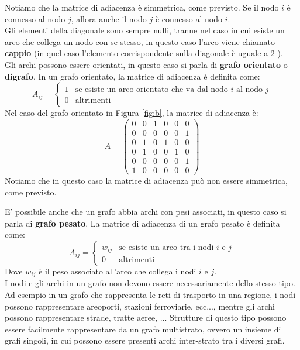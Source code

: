Notiamo che la matrice di adiacenza è simmetrica, come previsto. Se il nodo $i$ è connesso al nodo $j$, allora anche il nodo $j$ è connesso al nodo $i$.\\
Gli elementi della diagonale sono sempre nulli, tranne nel caso in cui esiste un arco che collega un nodo con se stesso, in questo caso l'arco viene chiamato \textbf{cappio} (in quel caso l'elemento corrispondente sulla diagonale è uguale a 2 ).\\

Gli archi possono essere orientati, in questo caso si parla di \textbf{grafo orientato} o \textbf{digrafo}. In un grafo orientato, la matrice di adiacenza è definita come:
\begin{equation}
A_{ij} = \begin{cases}
1 & \text{se esiste un arco orientato che va dal nodo } i \text{ al nodo } j \\
0 & \text{altrimenti}
\end{cases} 
\end{equation}
Nel caso del grafo orientato in Figura \ref{fig:b}, la matrice di adiacenza è:
\begin{equation}
A = \begin{pmatrix}
0 & 0 & 1 & 0 & 0 & 0 \\
0 & 0 & 0 & 0 & 0 & 1 \\
0 & 1 & 0 & 1 & 0 & 0 \\
0 & 1 & 0 & 0 & 1 & 0 \\
0 & 0 & 0 & 0 & 0 & 1 \\
1 & 0 & 0 & 0 & 0 & 0
\end{pmatrix}
\end{equation}
Notiamo che in questo caso la matrice di adiacenza può non essere simmetrica, come previsto.

E' possibile anche che un grafo abbia archi con pesi associati, in questo caso si parla di \textbf{grafo pesato}. La matrice di adiacenza di un grafo pesato è definita come:
\begin{equation}
A_{ij} = \begin{cases}
w_{ij} & \text{se esiste un arco tra i nodi } i \text{ e } j \\
0 & \text{altrimenti}
\end{cases}
\end{equation}
Dove $w_{ij}$ è il peso associato all'arco che collega i nodi $i$ e $j$.\\
I nodi e gli archi in un grafo non devono essere necessariamente dello stesso tipo. Ad esempio in un grafo che rappresenta le reti di trasporto in una regione, i nodi possono rappresentare areoporti, stazioni ferroviarie, ecc..., mentre gli archi possono rappresentare strade, tratte aeree, ... 
Strutture di questo tipo possono essere facilmente rappresentare da un grafo multistrato, ovvero un insieme di grafi singoli, in cui possono essere presenti archi inter-strato tra i diversi grafi.

